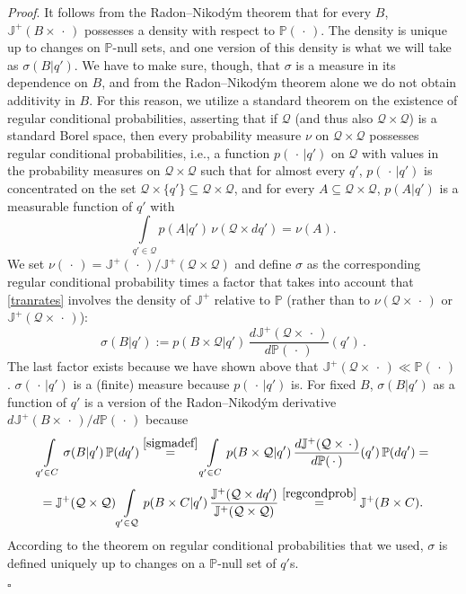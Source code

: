 \documentclass[12pt]{article}
\newcommand{\1}{\mathbf{1}} %
\newcommand{\conf}{\mathcal{Q}} %
\newcommand{\measure}{\mathbb{P}} %
\newcommand{\current}{\mathbb{J}}
\newenvironment{proof}{\noindent 
\textit{Proof}.}{\hfill$\square$\bigskip}
\begin{document}
\begin{proof}
It follows from the Radon--Nikod\'ym theorem that for every $B$,
$\current^+(B\times\,\cdot\,)$ possesses a density with respect to
$\measure(\,\cdot\,)$.  The density is unique up to changes on
$\measure$-null sets, and one version of this density is what we will
take as $\sigma(B|q')$.  We have to make sure, though, that $\sigma$
is a measure in its dependence on $B$, and from the Radon--Nikod\'ym
theorem alone we do not obtain additivity in $B$. For this reason, we
utilize a standard theorem \cite[p.~147]{Partha} on the existence of
regular conditional probabilities, asserting that if $\conf$ (and thus
also $\conf \times \conf$) is a standard Borel space, then every
probability measure $\nu$ on $\conf \times \conf$ possesses regular
conditional probabilities, i.e., a function $p(\,\cdot\,|q')$ on
$\conf$ with values in the probability measures on $\conf \times
\conf$ such that for almost every $q'$, $p(\,\cdot\,|q')$ is
concentrated on the set $\conf \times \{q'\} \subseteq \conf \times
\conf$, and for every $A\subseteq \conf \times \conf$, $p(A|q')$ is a
measurable function of $q'$ with
\begin{equation}\label{regcondprob}
   \int\limits_{q' \in \conf} p(A|q') \, \nu(\conf \times dq') =
   \nu(A).
\end{equation}
We set $\nu(\,\cdot\,) = \current^+(\,\cdot\,)/\current^+(\conf \times
\conf)$ and define $\sigma$ as the corresponding regular conditional
probability times a factor that takes into account that
\eqref{tranrates} involves the density of $\current^+$ relative to
$\measure$ (rather than to $\nu(\conf \times \,\cdot\,)$ or
$\current^+(\conf \times \,\cdot\,)$):
\begin{equation}\label{sigmadef}
   \sigma(B|q') := p(B \times \conf|q') \, \frac{d\current^+(\conf
   \times \,\cdot\,)} {d\measure(\,\cdot\,)}(q') \,.
\end{equation}
The last factor exists because we have shown above that
$\current^+(\conf \times \,\cdot\,) \ll \measure(\,\cdot\,)$.
$\sigma(\,\cdot\,|q')$ is a (finite) measure because $p(\,\cdot\,|q')$
is.  For fixed $B$, $\sigma(B|q')$ as a function of $q'$ is a version
of the Radon--Nikod\'ym derivative $d\current^+(B \times
\,\cdot\,)/d\measure(\,\cdot\,)$ because
\[
   \int\limits_{q' \in C} \sigma(B|q') \, \measure(dq')
   \stackrel{\eqref{sigmadef}}{=} \int\limits_{q' \in C} p(B \times
   \conf|q') \, \frac{d\current^+(\conf \times \,\cdot\,)} {d\measure
   (\,\cdot\,)}(q') \, \measure(dq') =
\]
\[
   = \current^+(\conf \times \conf) \int\limits_{q' \in \conf} p(B
   \times C|q') \,\frac{\current^+(\conf \times dq')}{\current^+(\conf
   \times \conf)} \stackrel{\eqref{regcondprob}}{=} \current^+(B \times
   C).
\]
According to the theorem on regular conditional probabilities that we
used, $\sigma$ is defined uniquely up to changes on a $\measure$-null
set of $q'$s.


\end{proof}
\end{document}
